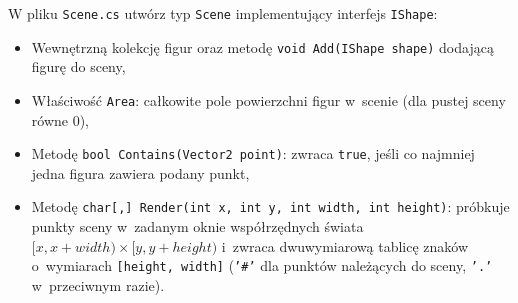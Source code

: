 \documentclass[11pt,a4paper,addpoints]{exam}
\begin{document}
\begin{questions}
\question[2]
W pliku \texttt{Scene.cs} utwórz typ \texttt{Scene} implementujący interfejs \texttt{IShape}:
\begin{itemize}
    \item Wewnętrzną kolekcję figur oraz metodę \texttt{void Add(IShape shape)} dodającą figurę do sceny,
    \item Właściwość \texttt{Area}: całkowite pole powierzchni figur w~scenie (dla pustej sceny równe 0),
    \item Metodę \texttt{bool Contains(Vector2 point)}: zwraca \texttt{true}, jeśli co najmniej jedna figura zawiera podany punkt,
    \item Metodę \texttt{char[,] Render(int x, int y, int width, int height)}: próbkuje punkty sceny w~zadanym oknie współrzędnych świata $[x, x + width) \times [y, y + height)$ i~zwraca dwuwymiarową tablicę znaków o~wymiarach \texttt{[height, width]} (\texttt{'\#'} dla punktów należących do sceny, \texttt{'.'} w~przeciwnym razie).
\end{itemize}

\end{questions}
\end{document}
